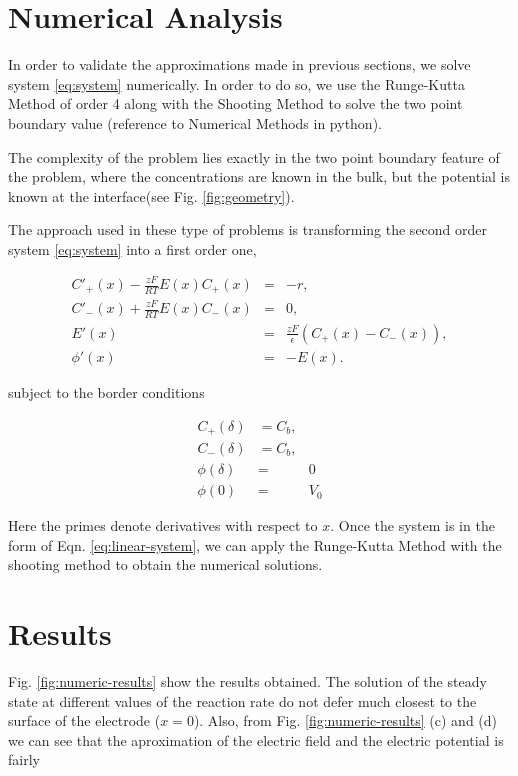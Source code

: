 


\section{Numerical Analysis}

In order to validate the approximations made in previous sections, we solve system \ref{eq:system} numerically. In order to do so, we use the Runge-Kutta Method of order 4 along with the  Shooting Method to solve the two point boundary value (reference to Numerical Methods in python).  



The complexity of the problem lies exactly in the two point boundary feature of the problem, where the concentrations are known in the bulk, but the potential is known at the interface(see Fig. \ref{fig:geometry}). 

The approach used in these type of problems is transforming the second order system \ref{eq:system} into a first order one,

\begin{eqnarray}
C'_+(x)-\frac{zF}{RT}E(x)C_+(x) &=& -r, \\
C'_-(x)+\frac{zF}{RT}E(x)C_-(x) &=& 0, \\
E'(x) &=& \frac{zF}{\epsilon}(C_+(x)-C_-(x)), \\
\phi'(x) &=& -E(x).
\label{eq:linear-system}
\end{eqnarray}

subject to the border conditions

\begin{eqnarray}
C_+(\delta) &= C_b,  \\
C_-(\delta) &= C_b, \\
\phi(\delta) &=& 0\\
\phi(0) &=&  V_0
\label{eq:linear-system}
\end{eqnarray}

Here the primes denote derivatives with respect to $x$. Once the system is in the form of Eqn. \ref{eq:linear-system}, we can apply the Runge-Kutta Method with the shooting method to obtain the numerical solutions. 


\section{Results}

Fig. \ref{fig:numeric-results} show the results obtained. The solution of the steady state at different values of the reaction rate do not defer much closest to the surface of the electrode ($x=0$). Also, from Fig. \ref{fig:numeric-results} (c) and (d) we can see that the aproximation of the electric field and the electric potential is fairly 


